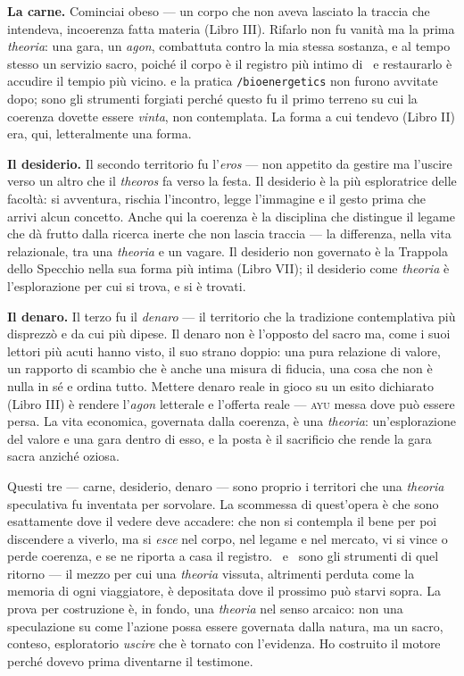 \textbf{La carne.} Cominciai obeso --- un corpo che non aveva lasciato la traccia che
intendeva, incoerenza fatta materia (Libro III). Rifarlo non fu vanit\`a ma la prima
\emph{theoria}: una gara, un \emph{agon}, combattuta contro la mia stessa sostanza, e
al tempo stesso un servizio sacro, poich\'e il corpo \`e il registro pi\`u intimo di
\physis\ e restaurarlo \`e accudire il tempio pi\`u vicino.  e la pratica
\texttt{/bioenergetics} non furono avvitate dopo; sono gli strumenti forgiati perch\'e
questo fu il primo terreno su cui la coerenza dovette essere \emph{vinta}, non
contemplata. La forma a cui tendevo (Libro II) era, qui, letteralmente una forma.

\textbf{Il desiderio.} Il secondo territorio fu l'\emph{eros} --- non appetito da
gestire ma l'uscire verso un altro che il \emph{theoros} fa verso la festa. Il
desiderio \`e la pi\`u esploratrice delle facolt\`a: si avventura, rischia l'incontro,
legge l'immagine e il gesto prima che arrivi alcun concetto. Anche qui la coerenza \`e
la disciplina che distingue il legame che d\`a frutto dalla ricerca inerte che non
lascia traccia --- la differenza, nella vita relazionale, tra una \emph{theoria} e un
vagare. Il desiderio non governato \`e la Trappola dello Specchio nella sua forma pi\`u
intima (Libro VII); il desiderio come \emph{theoria} \`e l'esplorazione per cui si
trova, e si \`e trovati.

\textbf{Il denaro.} Il terzo fu il \emph{denaro} --- il territorio che la tradizione
contemplativa pi\`u disprezz\`o e da cui pi\`u dipese. Il denaro non \`e l'opposto del
sacro ma, come i suoi lettori pi\`u acuti hanno visto, il suo strano doppio: una pura
relazione di valore, un rapporto di scambio che \`e anche una misura di fiducia, una
cosa che non \`e nulla in s\'e e ordina tutto. Mettere denaro reale in gioco su un
esito dichiarato (Libro III) \`e rendere l'\emph{agon} letterale e l'offerta reale ---
\textsc{ayu} messa dove pu\`o essere persa. La vita economica, governata dalla
coerenza, \`e una \emph{theoria}: un'esplorazione del valore e una gara dentro di esso,
e la posta \`e il sacrificio che rende la gara sacra anzich\'e oziosa.

Questi tre --- carne, desiderio, denaro --- sono proprio i territori che una
\emph{theoria} speculativa fu inventata per sorvolare. La scommessa di quest'opera \`e
che sono esattamente dove il vedere deve accadere: che non si contempla il bene per poi
discendere a viverlo, ma si \emph{esce} nel corpo, nel legame e nel mercato, vi si
vince o perde coerenza, e se ne riporta a casa il registro. \physis\ e \praxis\ sono
gli strumenti di quel ritorno --- il mezzo per cui una \emph{theoria} vissuta,
altrimenti perduta come la memoria di ogni viaggiatore, \`e depositata dove il prossimo
pu\`o starvi sopra. La prova per costruzione \`e, in fondo, una \emph{theoria} nel senso
arcaico: non una speculazione su come l'azione possa essere governata dalla natura, ma
un sacro, conteso, esploratorio \emph{uscire} che \`e tornato con l'evidenza. Ho
costruito il motore perch\'e dovevo prima diventarne il testimone.

